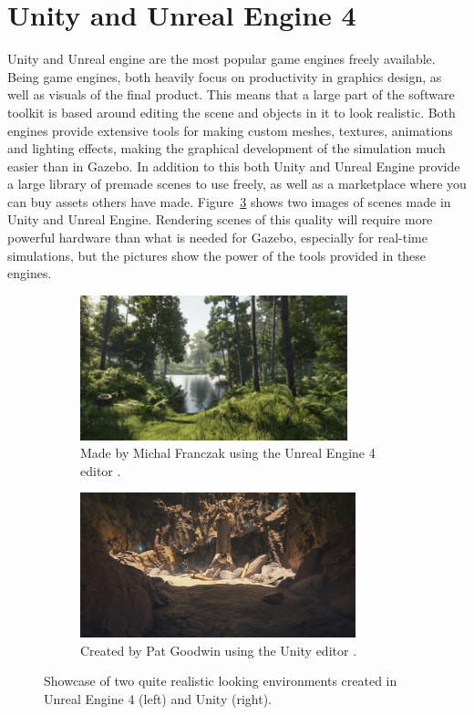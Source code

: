 \section{Unity and Unreal Engine 4} \label{sec: UnityUnreal}

Unity and Unreal engine are the most popular game engines freely available. Being game engines, both heavily focus on productivity in graphics design, as well as visuals of the final product. This means that a large part of the software toolkit is based around editing the scene and objects in it to look realistic. Both engines provide extensive tools for making custom meshes, textures, animations and lighting effects, making the graphical development of the simulation much easier than in Gazebo. In addition to this both Unity and Unreal Engine provide a large library of premade scenes to use freely, as well as a marketplace where you can buy assets others have made. Figure~\ref{fig:showcase_unityunreal} shows two images of scenes made in Unity and Unreal Engine. Rendering scenes of this quality will require more powerful hardware than what is needed for Gazebo, especially for real-time simulations, but the pictures show the power of the tools provided in these engines. 

\begin{figure}[!htb]
    \centering
    \begin{subfigure}{0.49\textwidth}
        \includegraphics[height=4.2cm]{rapport/fig/Simulator/unrealforest.jpg}
        \caption{Made by Michal Franczak using the Unreal Engine 4 editor \cite{Unrealshowcase}.}
        \label{fig:unreal_forest}
    \end{subfigure}
    \begin{subfigure}{0.49\textwidth}
        \includegraphics[height=4.2cm]{rapport/fig/Simulator/unitycave.jpg}
        \caption{Created by Pat Goodwin using the Unity editor \cite{Unityshowcase}.}
        \label{fig:Unity_cave}
    \end{subfigure}
    \caption{Showcase of two quite realistic looking environments created in Unreal Engine 4 (left) and Unity (right).}
    \label{fig:showcase_unityunreal}
\end{figure}

